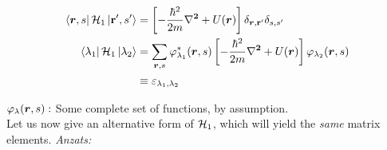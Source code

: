 \begin{align}
	\bra{\vr,s} \Ha_1 \ket*{\vb{r'},s'} &= \left[-\frac{\hbar^2}{2m} \vb{\laplacian}+ U(\vr) \right] \delta_{\vr, \vb{r'}} \delta_{s,s'}\\
	\bra{\lambda_1} \Ha_1 \ket{\lambda_2} &= \sum_{\vr,s} \varphi_{\lambda_1}^* (\vr,s) \left[-\frac{\hbar^2}{2m} \vb{\laplacian}+ U(\vr) \right] \varphi_{\lambda_2} (\vr,s)\\
	&\equiv \varepsilon_{\lambda_1, \lambda_2} \nonumber
\end{align}

\noindent $\varphi_\lambda (\bm{r},s): $ Some complete set of functions, by assumption.\\
\linebreak
\noindent Let us now give an alternative form of $\mathcal{H}_1$, which will yield the \emph{same} matrix elements.
\linebreak
\noindent \emph{Anzats:}

